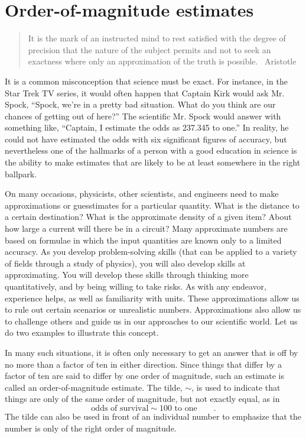 \section{Order-of-magnitude estimates}

\begin{quotation}
It is the mark of an instructed mind to rest satisfied with
the degree of precision that the nature of the subject
permits and not to seek an exactness where only an
approximation of the truth is possible. ~Aristotle
\end{quotation}

It is a common misconception that science must be exact. For
instance, in the Star Trek TV series, it would often happen
that Captain Kirk would ask Mr. Spock, ``Spock, we're in a
pretty bad situation. What do you think are our chances of
getting out of here?'' The scientific Mr. Spock would answer
with something like, ``Captain, I estimate the odds as
237.345 to one.'' In reality, he could not have estimated
the odds with six significant figures of accuracy, but
nevertheless one of the hallmarks of a person with a good
education in science is the ability to make estimates that
are likely to be at least somewhere in the right ballpark.

On many occasions, physicists, other scientists, and engineers need to make approximations or guesstimates for a particular quantity. What is the distance to a certain destination? What is the approximate density of a given item? About how large a current will there be in a circuit? Many approximate numbers are based on formulae in which the input quantities are known only to a limited accuracy. As you develop problem-solving skills (that can be applied to a variety of fields through a study of physics), you will also develop skills at approximating. You will develop these skills through thinking more quantitatively, and by being willing to take risks. As with any endeavor, experience helps, as well as familiarity with units. These approximations allow us to rule out certain scenarios or unrealistic numbers. Approximations also allow us to challenge others and guide us in our approaches to our scientific world. Let us do two examples to illustrate this concept.

In many such situations, it is often only necessary to get
an answer that is off by no more than a factor of ten in
either direction. Since things that differ by a factor of
ten are said to differ by one order of magnitude, such an
estimate is called an order-of-magnitude estimate. The
tilde, $\sim$, is used to indicate that things are only of
the same order of magnitude, but not exactly equal, as in
\begin{equation*}
 \text{odds of survival} \sim \text{100 to one} \qquad .
\end{equation*}
The tilde can also be used in front of an individual number
to emphasize that the number is only of the right order of magnitude.

